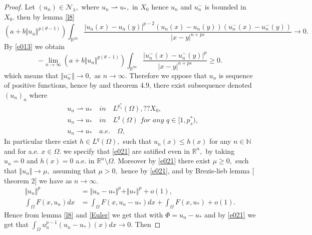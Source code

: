 \documentclass[10pt,twoside,reqno,centertags,draft]{amsart}
\begin{document}
\begin{proof}
Let $ (u_n)\in \mathcal{N}_{\lambda},$ where $ u_n \rightharpoonup u_*,$ in $ X_0$ hence $ u_n$ and $ u_n^-$ is bounded in $ X_0.$ then by lemma \ref{l8}
\begin{equation*}
 (a +b\Vert u_n \Vert^{p(\theta -1)}) \int_{\mathbb{R}^{2n}} \frac{\vert u_n(x) - u_n(y) \vert^{p-2}(u_n(x) - u_n(y))(u_n^-(x) - u_n^-(y))}{\vert x-y \vert^{n + ps}} \longrightarrow 0.
\end{equation*}
By \ref{e013} we obtain
\begin{equation*}
-\lim_{n \to \infty}(a +b\Vert u_n \Vert^{p(\theta -1)}) \int_{\mathbb{R}^{2n}}\frac{\vert u_n^-(x) - u_n^-(y) \vert^{p}}{\vert x-y \vert^{n + ps}} \geq 0.
\end{equation*}
which means that $ \Vert u_n^-\Vert \longrightarrow 0,$ as $ n \to \infty.$ Therefore we sppose that $ u_n$ is sequence of positive functions,  hence by \cite{servadei2012mountain} and \cite{brezis2011functional} theorem 4.9, there exist subsequence denoted $ (u_n)_n$ where
\begin{equation}\label{e021}
\begin{aligned}
& u_n \rightharpoonup u_* \quad \textit{in}   \quad L^{p_s^*}(\Omega),?? X_0,\\
& u_n \longrightarrow u_* \quad \textit{in}   \quad L^{q}(\Omega) \,\, \textit{for any}\,\, q \in [1,p_s^*),\\
& u_n \longrightarrow u_* \quad \textit{a.e.} \quad \Omega, 
\end{aligned}
\end{equation}
In particular there exist $ h\in L^{q}(\Omega),$ such that $ u_n(x) \leq h(x)$ for any $ n \in \mathbb{N}$ and for a.e. $ x \in \Omega.$ we specify 
that \ref{e021} are satified even in $ \mathbb{R}^n,$ by taking $ u_n =0$ and $ h(x) =0$ a.e. in $ \mathbb{R}^n \setminus \Omega.$ Moreover by \ref{e021}
there exist $ \mu \geq 0,$ such that $ \Vert u_n\Vert \longrightarrow \mu,$ assuming that $ \mu >0,$ hence by \ref{e021}, \cite{brezis1983relation}
and by Brezis-lieb lemma [\cite{brezislieb} theorem 2] we have as $ n \to \infty.$
\begin{equation}
\begin{aligned}
 \Vert u_n\Vert^{p} &=\Vert u_n -u_*\Vert^{p} +\Vert u_*\Vert^{p} +o(1),\\
 \int_{\Omega}F(x,u_n)dx &=\int_{\Omega}F(x,u_n -u_*)dx +\int_{\Omega}F(x,u_*) +o(1).
\end{aligned}
\end{equation}
Hence from lemma \ref{l8} and \ref{Euler} we get that with $ \Phi = u_n -u_*$ and by \ref{e021} we get that $ \int_{\Omega}  u_n^{p-1}(u_n -u_*)(x) dx \longrightarrow 0.$ Then

\end{proof}
\end{document}
